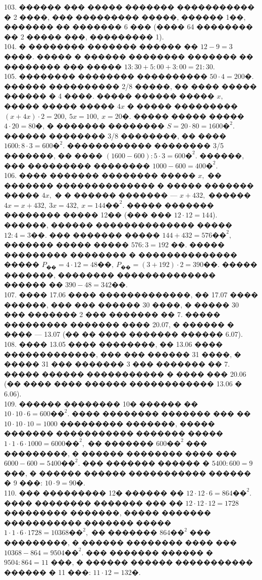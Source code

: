 \documentclass[12pt]{article}
\begin{document}
103. ������ ��� ����� ������� ����������� � 2 ����, ��� ��������� �����, ������ 1��, ������� �� ������� 6 ��� (���� 64 �������� �� 2 ����� ���, ��������� 1).\\
104. � �������� ������� ������ �� $12-9=3$ ����. ����� � ������ �������� ������� �� �������� ��� ����� $13:30+5:00+3:00=21:30.$\\
105. �������� �������� ���������� $50\cdot4=200$�. ������ ���������� 2/8 �����, �� ���� ����� ������ � 4 ����. ����� ������ ����� $x,$ ����� ����� ����� $4x$ � ����� ��������� $(x+4x)\cdot2=200,\ 5x=100,\ x=20$�. ����� ����� ����� $4\cdot20=80$�, � ������� �������� $S=20\cdot80=1600\text{�}^2.$ ������ �������� 3/8 ��������, �� ���� $1600:8\cdot3=600\text{�}^2.$ ������������ �������� 3/5 �������, �� ���� $(1600-600):5\cdot3=600\text{�}^2.$ ������, ��� ��������� �������� $1000-600=400\text{�}^2.$\\
106. ���� ������� �������� ����� $x,$ �� ������� �������������� � ����� ������� ����� $4x,$ � � ������ ������� --- $x+432,$ ������ $4x=x+432,\ 3x=432,\ x=144\text{��}^2.$ ����� ������� �������� ����� 12�� (��� ��� $12\cdot12=144$). ������, ������ �������������� ����� $12:4=3$��. ��� ������� ����� $144+432=576\text{��}^2,$ ������� ����� ����� $576:3=192$ ��. ����� ��������� �������� � �������������� ����� $P_\text{��}=4\cdot12=48\text{��},\ P_\text{��}=(3+192)\cdot2=390\text{��}.$ ����� �������, �������� �������������� ������ �� $390-48=342$��.\\
107. ���� 17.06 ���� �������������, �� 17.07 ���� ������, ��� ��� ������ 30 ����, � ����� 30 ��� ������� 2 ��� ������� �� 7. ����� ��������� ������� ���� 20.07, � ������ � ���� --- 13.07 (�� �� ���� ������� ������ 6.07).\\
108. ���� 13.05 ���� ��������, �� 13.06 ���� �������������, ��� ��� ������ 31 ����, � ����� 31 ��� ������� 3 ��� ������� �� 7. ����� ������ ����������� � ���� ��� 20.06 (�� ���� ���� ������ ������������ 13.06 � 6.06).\\
109. ������ �������� 10� ������ �� $10\cdot10\cdot6=600\text{��}^2.$ ���� �������� ������� ��� �� $10\cdot10\cdot10=1000$ ��������� �������, ����� ������� ����������� ������� ����� $1\cdot1\cdot6\cdot1000=6000\text{��}^2,$ �� ������� $600\text{��}^2$ ��� ���������, � ������ �������� ���� ��� $6000-600=5400\text{��}^2.$ ��� ������� ������ � $5400:600=9$ ���, � ������ ������ ����������� ������ � 9 ���: $10\cdot9=90$�.\\
110. ��� ��������� 12� ������ �� $12\cdot12\cdot6=864\text{��}^2.$ ���� �������� ������� ��� �� $12\cdot12\cdot12=1728$ ��������� �������, ����� ������� ����������� ������� ����� $1\cdot1\cdot6\cdot1728=10368\text{��}^2,$ �� ������� $864\text{��}^2$ ��� ���������, � ������ �������� ���� ��� $10368-864=9504\text{��}^2.$ ��� ������� ������ � $9504:864=11$ ���, � ������ ������ ����������� ������ � 11 ���: $11\cdot12=132$�.\\
\end{document}
